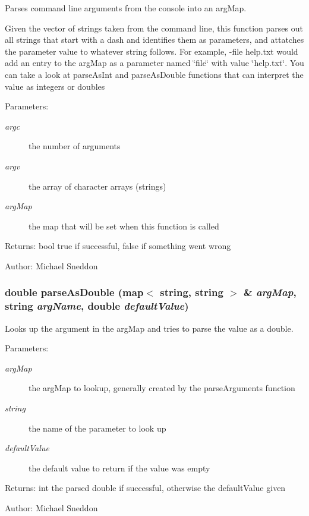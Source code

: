 Parses command line arguments from the console into an argMap. 

Given the vector of strings taken from the command line, this function parses out all strings that start with a dash and identifies them as parameters, and attatches the parameter value to whatever string follows. For example, -file help.txt would add an entry to the argMap as a parameter named \char`\"{}file\char`\"{} with value \char`\"{}help.txt\char`\"{}. You can take a look at parseAsInt and parseAsDouble functions that can interpret the value as integers or doubles

\begin{Desc}
\item[Parameters:]
\begin{description}
\item[{\em argc}]the number of arguments \item[{\em argv}]the array of character arrays (strings) \item[{\em argMap}]the map that will be set when this function is called \end{description}
\end{Desc}
\begin{Desc}
\item[Returns:]bool true if successful, false if something went wrong \end{Desc}
\begin{Desc}
\item[Author:]Michael Sneddon \end{Desc}
\subsubsection[parseAsDouble]{\setlength{\rightskip}{0pt plus 5cm}double parseAsDouble (map$<$ string, string $>$ \& {\em argMap}, \/  string {\em argName}, \/  double {\em defaultValue})}\label{commandLineParser_8cpp_412e89bbcc308c634d3911a49280bbbc}


Looks up the argument in the argMap and tries to parse the value as a double. 

\begin{Desc}
\item[Parameters:]
\begin{description}
\item[{\em argMap}]the argMap to lookup, generally created by the parseArguments function \item[{\em string}]the name of the parameter to look up \item[{\em defaultValue}]the default value to return if the value was empty \end{description}
\end{Desc}
\begin{Desc}
\item[Returns:]int the parsed double if successful, otherwise the defaultValue given \end{Desc}
\begin{Desc}
\item[Author:]Michael Sneddon \end{Desc}


